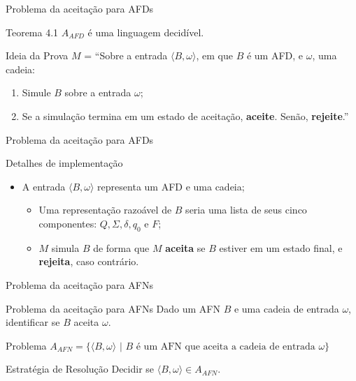 \documentclass[xcolor=dvipsnames,table]{beamer}
\begin{document}
	\begin{frame}{Problema da aceitação para AFDs}
		\begin{block}{Teorema 4.1}
			$A_{AFD}$ é uma linguagem decidível.
		\end{block}  
		\begin{block}{Ideia da Prova}
			$M$ = ``Sobre a entrada $\langle B, \omega \rangle$, em que $B$ é um AFD, e $\omega$, uma cadeia:
			\begin{enumerate}
				\item Simule $B$ sobre a entrada $\omega$;
				\item Se a simulação termina em um estado de aceitação, {\bf aceite}. Senão, {\bf rejeite}.''
			\end{enumerate}
		\end{block}
	\end{frame}
	
	\begin{frame}{Problema da aceitação para AFDs}
		\begin{block}{Detalhes de implementação}
			\begin{itemize}
				\item A entrada $\langle B, \omega \rangle$ representa um AFD e uma cadeia;
				\begin{itemize}
					\item Uma representação razoável de $B$ seria uma lista de seus cinco componentes: $Q, \Sigma, \delta, q_0$ e $F$;
					\item $M$ simula $B$ de forma que $M$ {\bf aceita} se $B$ estiver em um estado final, e {\bf rejeita}, caso contrário.
				\end{itemize}
			\end{itemize}
		\end{block}
	\end{frame}
	
	\begin{frame}{Problema da aceitação para AFNs}
		\begin{block}{Problema da aceitação para AFNs}
			Dado um AFN $B$ e uma cadeia de entrada $\omega$, identificar se $B$ aceita $\omega$.
		\end{block}	 
		\begin{block}{Problema}
			$A_{AFN} = \{ \langle B, \omega \rangle \mbox{ | } B \mbox{ é um AFN que aceita a cadeia de entrada } \omega \}$
		\end{block}  
		\begin{block}{Estratégia de Resolução}
			Decidir se $\langle B, \omega \rangle \in A_{AFN}$.
		\end{block}
	\end{frame}	
	
\end{document}
